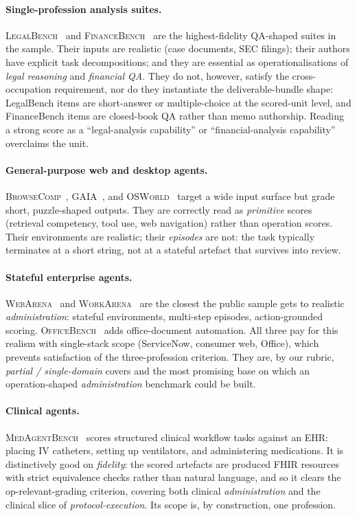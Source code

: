 \documentclass{article}
\begin{document}
\paragraph{Single-profession analysis suites.} \textsc{LegalBench}~\citep{legalbench2023} and \textsc{FinanceBench}~\citep{financebench2023} are the highest-fidelity QA-shaped suites in the sample.
Their inputs are realistic (case documents, SEC filings); their authors have explicit task decompositions; and they are essential as operationalisations of \emph{legal reasoning} and \emph{financial QA}.
They do not, however, satisfy the cross-occupation requirement, nor do they instantiate the deliverable-bundle shape: LegalBench items are short-answer or multiple-choice at the scored-unit level, and FinanceBench items are closed-book QA rather than memo authorship.
Reading a strong score as a ``legal-analysis capability'' or ``financial-analysis capability'' overclaims the unit.

\paragraph{General-purpose web and desktop agents.} \textsc{BrowseComp}~\citep{browsecomp2024}, \textsc{GAIA}~\citep{gaia2023}, and \textsc{OSWorld}~\citep{osworld2024} target a wide input surface but grade short, puzzle-shaped outputs.
They are correctly read as \emph{primitive} scores (retrieval competency, tool use, web navigation) rather than operation scores.
Their environments are realistic; their \emph{episodes} are not: the task typically terminates at a short string, not at a stateful artefact that survives into review.

\paragraph{Stateful enterprise agents.} \textsc{WebArena}~\citep{webarena2023} and \textsc{WorkArena}~\citep{workarena2024} are the closest the public sample gets to realistic \emph{administration}: stateful environments, multi-step episodes, action-grounded scoring.
\textsc{OfficeBench}~\citep{officebench2024} adds office-document automation.
All three pay for this realism with single-stack scope (ServiceNow, consumer web, Office), which prevents satisfaction of the three-profession criterion.
They are, by our rubric, \emph{partial / single-domain} covers and the most promising base on which an operation-shaped \emph{administration} benchmark could be built.

\paragraph{Clinical agents.} \textsc{MedAgentBench}~\citep{medagentbench2024} scores structured clinical workflow tasks against an EHR: placing IV catheters, setting up ventilators, and administering medications.
It is distinctively good on \emph{fidelity}: the scored artefacts are produced FHIR resources with strict equivalence checks rather than natural language, and so it clears the op-relevant-grading criterion, covering both clinical \emph{administration} and the clinical slice of \emph{protocol-execution}.
Its scope is, by construction, one profession.
\end{document}
